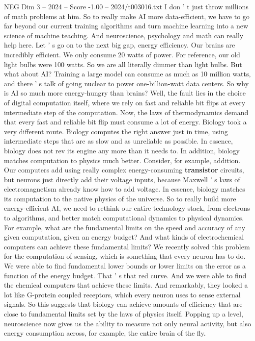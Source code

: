 \begin{textsample}{NEG Dim 3 – 2024 – Score -1.00 – 2024/t003016.txt}
I don ' t just throw millions of math problems at him.
So to really make AI more data-efficient, we have to go far beyond our current training algorithms and turn machine learning into a new science of machine teaching.
And neuroscience, psychology and math can really help here.
Let ' s go on to the next big gap, energy efficiency.
Our brains are incredibly efficient.
We only consume 20 watts of power.
For reference, our old light bulbs were 100 watts.
So we are all literally dimmer than light bulbs.
But what about AI?
Training a large model can consume as much as 10 million watts, and there ' s talk of going nuclear to power one-billion-watt data centers.
So why is AI so much more energy-hungry than brains?
Well, the fault lies in the choice of digital computation itself, where we rely on fast and reliable bit flips at every intermediate step of the computation.
Now, the laws of thermodynamics demand that every fast and reliable bit flip must consume a lot of energy.
Biology took a very different route.
Biology computes the right answer just in time, using intermediate steps that are as slow and as unreliable as possible.
In essence, biology does not rev its engine any more than it needs to.
In addition, biology matches computation to physics much better.
Consider, for example, addition.
Our computers add using really complex energy-consuming \textbf{transistor} circuits, but neurons just directly add their voltage inputs, because Maxwell ' s laws of electromagnetism already know how to add voltage.
In essence, biology matches its computation to the native physics of the universe.
So to really build more energy-efficient AI, we need to rethink our entire technology stack, from electrons to algorithms, and better match computational dynamics to physical dynamics.
For example, what are the fundamental limits on the speed and accuracy of any given computation, given an energy budget?
And what kinds of electrochemical computers can achieve these fundamental limits?
We recently solved this problem for the computation of sensing, which is something that every neuron has to do.
We were able to find fundamental lower bounds or lower limits on the error as a function of the energy budget.
That ' s that red curve.
And we were able to find the chemical computers that achieve these limits.
And remarkably, they looked a lot like G-protein coupled receptors, which every neuron uses to sense external signals.
So this suggests that biology can achieve amounts of efficiency that are close to fundamental limits set by the laws of physics itself.
Popping up a level, neuroscience now gives us the ability to measure not only neural activity, but also energy consumption across, for example, the entire brain of the fly.

\end{textsample}
